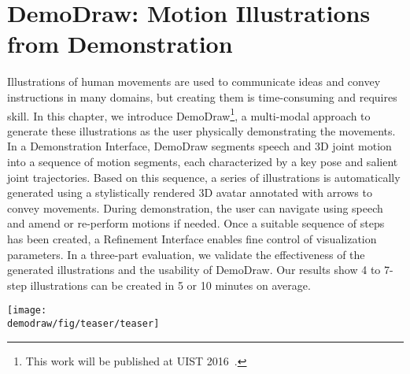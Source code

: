 
\chapter{DemoDraw: Motion Illustrations from Demonstration}
\label{chapter_demodraw}

\newcommand{\systemname}{DemoDraw}
\newcommand{\phaseI}{Demonstration Interface}
\newcommand{\phaseII}{Refinement Interface}

Illustrations of human movements are used to communicate ideas and convey instructions in many domains, but creating them is time-consuming and requires skill. In this chapter, we introduce DemoDraw\footnote{This work will be published at UIST 2016~\cite{Chi:2016:DemoDraw}.}, a multi-modal approach to generate these illustrations as the user physically demonstrating the movements. In a Demonstration Interface, DemoDraw segments speech and 3D joint motion into a sequence of motion segments, each characterized by a key pose and salient joint trajectories. Based on this sequence, a series of illustrations is automatically generated using a stylistically rendered 3D avatar annotated with arrows to convey movements. During demonstration, the user can navigate using speech and amend or re-perform motions if needed. Once a suitable sequence of steps has been created, a Refinement Interface enables fine control of visualization parameters. In a three-part evaluation, we validate the effectiveness of the generated illustrations and the usability of DemoDraw. Our results show 4 to 7-step illustrations can be created in 5 or 10 minutes on average.

\begin{figure*}[t]
  \centering
  \texttt{[image: \\demodraw/fig/teaser/teaser]}
  \caption{\systemname{}: (a) multi-modal ``\phaseI{}'' to capture motion, verify results, and re-perform portions if needed; (b) conventional \phaseII{} for refinement and exploring other visualization styles; (c-d) examples of illustration styles.}
  \label{fig:demodraw_teaser}
\end{figure*}








